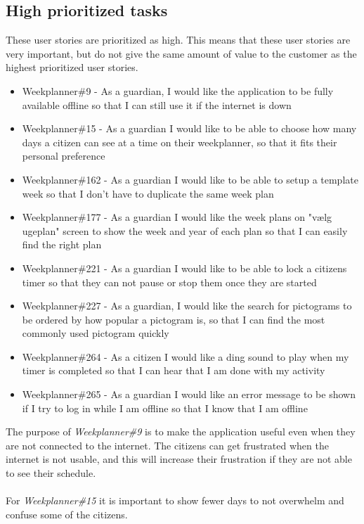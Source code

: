 \subsection{High prioritized tasks}
These user stories are prioritized as high. 
This means that these user stories are very important, but do not give the same amount of value to the customer as the highest prioritized user stories.
\begin{itemize}
    \item Weekplanner\#9 - As a guardian, I would like the application to be fully available offline so that I can still use it if the internet is down
    \item Weekplanner\#15 - As a guardian I would like to be able to choose how many days a citizen can see at a time on their weekplanner, so that it fits their personal preference 
    \item Weekplanner\#162 - As a guardian I would like to be able to setup a template week so that I don't have to duplicate the same week plan  
    \item Weekplanner\#177 - As a guardian I would like the week plans on "vælg ugeplan" screen to show the week and year of each plan so that I can easily find the right plan 
    \item Weekplanner\#221 - As a guardian I would like to be able to lock a citizens timer so that they can not pause or stop them once they are started
    \item Weekplanner\#227 - As a guardian, I would like the search for pictograms to be ordered by how popular a pictogram is, so that I can find the most commonly used pictogram quickly
    \item Weekplanner\#264 - As a citizen I would like a ding sound to play when my timer is completed so that I can hear that I am done with my activity
    \item Weekplanner\#265 - As a guardian I would like an error message to be shown if I try to log in while I am offline so that I know that I am offline
\end{itemize}
\noindent
The purpose of \textit{Weekplanner\#9} is to make the application useful even when they are not connected to the internet.
The citizens can get frustrated when the internet is not usable, and this will increase their frustration if they are not able to see their schedule.
\\\\
For \textit{Weekplanner\#15} it is important to show fewer days to not overwhelm and confuse some of the citizens.
